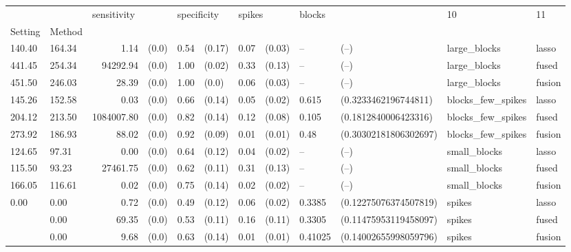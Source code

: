 \begin{tabular}{llrlrlrlllll}
\toprule
       &        & \multicolumn{2}{l}{sensitivity} & \multicolumn{2}{l}{specificity} & \multicolumn{2}{l}{spikes} & \multicolumn{2}{l}{blocks} &                 10 &      11 \\
Setting & Method &              &        &              &         &         &         &          &                        &                    &         \\
\midrule
140.40 & 164.34 &         1.14 &  (0.0) &         0.54 &  (0.17) &    0.07 &  (0.03) &       -- &                   (--) &       large\_blocks &   lasso \\
441.45 & 254.34 &     94292.94 &  (0.0) &         1.00 &  (0.02) &    0.33 &  (0.13) &       -- &                   (--) &       large\_blocks &   fused \\
451.50 & 246.03 &        28.39 &  (0.0) &         1.00 &   (0.0) &    0.06 &  (0.03) &       -- &                   (--) &       large\_blocks &  fusion \\
145.26 & 152.58 &         0.03 &  (0.0) &         0.66 &  (0.14) &    0.05 &  (0.02) &    0.615 &   (0.3233462196744811) &  blocks\_few\_spikes &   lasso \\
204.12 & 213.50 &   1084007.80 &  (0.0) &         0.82 &  (0.14) &    0.12 &  (0.08) &    0.105 &   (0.1812840006423316) &  blocks\_few\_spikes &   fused \\
273.92 & 186.93 &        88.02 &  (0.0) &         0.92 &  (0.09) &    0.01 &  (0.01) &     0.48 &  (0.30302181806302697) &  blocks\_few\_spikes &  fusion \\
124.65 & 97.31  &         0.00 &  (0.0) &         0.64 &  (0.12) &    0.04 &  (0.02) &       -- &                   (--) &       small\_blocks &   lasso \\
115.50 & 93.23  &     27461.75 &  (0.0) &         0.62 &  (0.11) &    0.31 &  (0.13) &       -- &                   (--) &       small\_blocks &   fused \\
166.05 & 116.61 &         0.02 &  (0.0) &         0.75 &  (0.14) &    0.02 &  (0.02) &       -- &                   (--) &       small\_blocks &  fusion \\
0.00   & 0.00   &         0.72 &  (0.0) &         0.49 &  (0.12) &    0.06 &  (0.02) &   0.3385 &  (0.12275076374507819) &             spikes &   lasso \\
       & 0.00   &        69.35 &  (0.0) &         0.53 &  (0.11) &    0.16 &  (0.11) &   0.3305 &  (0.11475953119458097) &             spikes &   fused \\
       & 0.00   &         9.68 &  (0.0) &         0.63 &  (0.14) &    0.01 &  (0.01) &  0.41025 &  (0.14002655998059796) &             spikes &  fusion \\
\bottomrule
\end{tabular}
